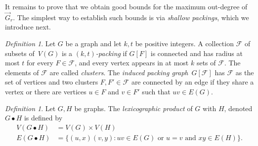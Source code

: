 \documentclass[1p,number,a4paper]{elsarticle}
\theoremstyle{remark}
\newtheorem{definition}[theorem]{Definition}
\newtheorem{lemma}[theorem]{Lemma}
\begin{document}
%
%
%
%
%
%
%

\medskip
It remains to prove that we obtain good bounds for the 
maximum out-degree of $\vec G_r$. The simplest way 
to establish such bounds is via \emph{shallow packings},
which we introduce next. 

\begin{definition}
Let $G$ be a graph and let $k,t$ be positive integers. A collection $\mathcal{F}$ of subsets of~$V(G)$ is a 
\emph{$(k,t)$-packing} if $G[F]$ is connected and has radius at most $t$ for 
every $F\in \mathcal{F}$, and every vertex appears in at most $k$ sets of $\mathcal{F}$.
The elements of $\mathcal{F}$ are called {\em{clusters}}.
The \emph{induced packing graph}~$G[\mathcal{F}]$ has $\mathcal{F}$ as the set of
vertices and two clusters $F,F'\in \mathcal{F}$ are connected  by an edge 
if they share a vertex or there are vertices $u\in F$ and $v\in F'$ 
such that $uv\in E(G)$. 
\end{definition}

\begin{definition}
Let $G,H$ be graphs. The \emph{lexicographic product} of 
$G$ with $H$, denoted $G\bullet H$ is defined by 
\begin{align*}
V(G\bullet H) & = V(G)\times V(H)\\
E(G\bullet H) & = \{(u,x)(v,y) :
 uv\in E(G) \text{ or $u=v$ and $xy\in E(H)$}\}.
\end{align*}
\end{definition}
\end{document}
